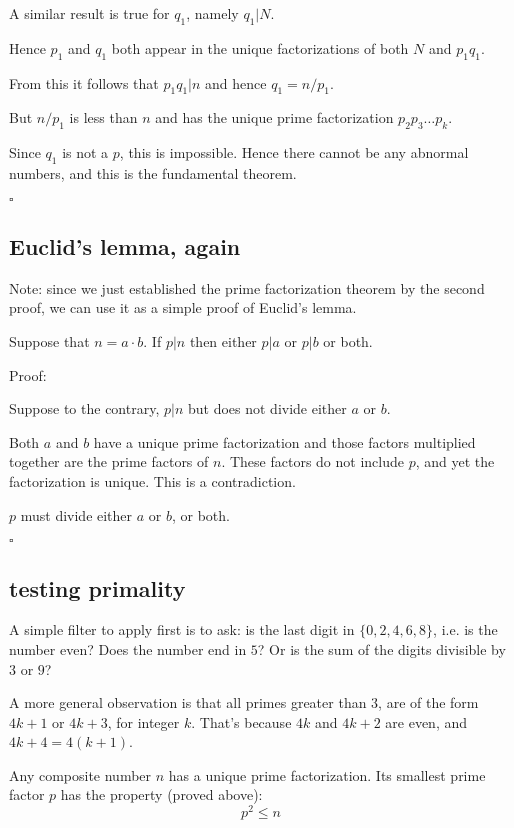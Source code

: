 \documentclass[11pt, oneside]{article}
\begin{document}
A similar result is true for $q_1$, namely $q_1 | N$.  

Hence $p_1$ and $q_1$ both appear in the unique factorizations of both $N$ and $p_1 q_1$.

From this it follows that $p_1 q_1 | n$ and hence $q_1 = n/p_1$.  

But $n/p_1$ is less than $n$ and has the unique prime factorization $p_2 p_3 \dots p_k$.

Since $q_1$ is not a $p$, this is impossible.  Hence there cannot be any abnormal numbers, and this is the fundamental theorem.

$\square$

\subsection*{Euclid's lemma, again}

Note:  since we just established the prime factorization theorem by the second proof, we can use it as a simple proof of Euclid's lemma.  

Suppose that $n=a \cdot b$.  If  $p | n$ then either $p | a$ or $p | b$ or both.

Proof:

Suppose to the contrary, $p | n$ but does not divide either $a$ or $b$.

Both $a$ and $b$ have a unique prime factorization and those factors multiplied together are the prime factors of $n$.  These factors do not include $p$, and yet the factorization is  unique.  This is a contradiction.

$p$ must divide either $a$ or $b$, or both.

$\square$

\subsection*{testing primality}

A simple filter to apply first is to ask:  is the last digit in $\{ 0,2,4,6,8 \}$, i.e. is the number even?  Does the number end in $5$?  Or is the sum of the digits divisible by $3$ or $9$?

A more general observation is that all primes greater than $3$, are of the form $4k + 1$ or $4k + 3$, for integer $k$.  That's because $4k$ and $4k + 2$ are even, and $4k + 4 = 4(k + 1)$.

Any composite number $n$ has a unique prime factorization.  Its smallest prime factor $p$ has the property (proved above):
\[ p^2 \le n \]
\end{document}
